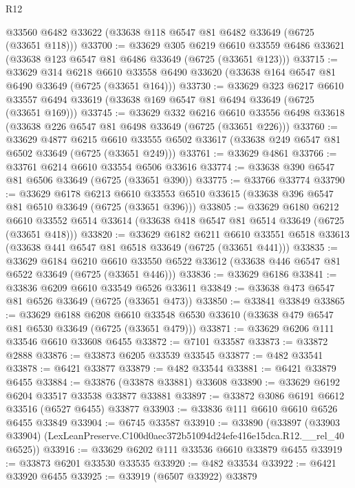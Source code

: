 \begin{lexlean}{R12}
\begin{coremodule}
    @33560
    @6482
    @33622
    (@33638 @118 @6547 @81 @6482 @33649 (@6725 (@33651 @118)))
@33700 := @33629
    @305
    @6219
    @6610
    @33559
    @6486
    @33621
    (@33638 @123 @6547 @81 @6486 @33649 (@6725 (@33651 @123)))
@33715 := @33629
    @314
    @6218
    @6610
    @33558
    @6490
    @33620
    (@33638 @164 @6547 @81 @6490 @33649 (@6725 (@33651 @164)))
@33730 := @33629
    @323
    @6217
    @6610
    @33557
    @6494
    @33619
    (@33638 @169 @6547 @81 @6494 @33649 (@6725 (@33651 @169)))
@33745 := @33629
    @332
    @6216
    @6610
    @33556
    @6498
    @33618
    (@33638 @226 @6547 @81 @6498 @33649 (@6725 (@33651 @226)))
@33760 := @33629
    @4877
    @6215
    @6610
    @33555
    @6502
    @33617
    (@33638 @249 @6547 @81 @6502 @33649 (@6725 (@33651 @249)))
@33761 := @33629 @4861
@33766 := @33761 @6214 @6610 @33554 @6506 @33616
@33774 := @33638 @390 @6547 @81 @6506 @33649 (@6725 (@33651 @390))
@33775 := @33766 @33774
@33790 := @33629
    @6178
    @6213
    @6610
    @33553
    @6510
    @33615
    (@33638 @396 @6547 @81 @6510 @33649 (@6725 (@33651 @396)))
@33805 := @33629
    @6180
    @6212
    @6610
    @33552
    @6514
    @33614
    (@33638 @418 @6547 @81 @6514 @33649 (@6725 (@33651 @418)))
@33820 := @33629
    @6182
    @6211
    @6610
    @33551
    @6518
    @33613
    (@33638 @441 @6547 @81 @6518 @33649 (@6725 (@33651 @441)))
@33835 := @33629
    @6184
    @6210
    @6610
    @33550
    @6522
    @33612
    (@33638 @446 @6547 @81 @6522 @33649 (@6725 (@33651 @446)))
@33836 := @33629 @6186
@33841 := @33836 @6209 @6610 @33549 @6526 @33611
@33849 := @33638 @473 @6547 @81 @6526 @33649 (@6725 (@33651 @473))
@33850 := @33841 @33849
@33865 := @33629
    @6188
    @6208
    @6610
    @33548
    @6530
    @33610
    (@33638 @479 @6547 @81 @6530 @33649 (@6725 (@33651 @479)))
@33871 := @33629 @6206 @111 @33546 @6610 @33608 @6455
@33872 := @7101 @33587
@33873 := @33872 @2888
@33876 := @33873 @6205 @33539 @33545
@33877 := @482 @33541
@33878 := @6421 @33877
@33879 := @482 @33544
@33881 := @6421 @33879 @6455
@33884 := @33876 (@33878 @33881) @33608
@33890 := @33629 @6192 @6204 @33517 @33538 @33877 @33881
@33897 := @33872 @3086 @6191 @6612 @33516 (@6527 @6455) @33877
@33903 := @33836 @111 @6610 @6610 @6526 @6455 @33849
@33904 := @6745 @33587
@33910 := @33890
    (@33897 (@33903 @33904) (LexLeanPreserve.C100d0aec372b51094d24efe416e15dca.R12.__rel_40 @6525))
@33916 := @33629 @6202 @111 @33536 @6610 @33879 @6455
@33919 := @33873 @6201 @33530 @33535
@33920 := @482 @33534
@33922 := @6421 @33920 @6455
@33925 := @33919 (@6507 @33922) @33879

\end{coremodule}
\end{lexlean}
